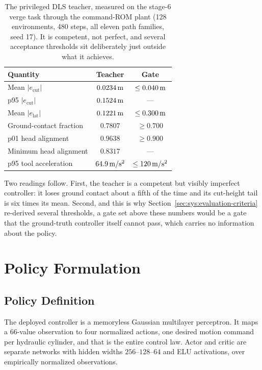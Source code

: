\begin{table}[tb]
  \centering
  \caption{The privileged DLS teacher, measured on the stage-6 verge task
  through the command-ROM plant (128 environments, 480 steps, all eleven path
  families, seed 17). It is competent, not perfect,
and several acceptance thresholds sit deliberately just outside what it achieves.}
  \label{tab:ctrl:teacher}
  \small
  \begin{tabular}{lcc}
    \toprule
    Quantity & Teacher & Gate \\
    \midrule
    Mean $|e_{\mathrm{cut}}|$        & $\unit[0.0234]{m}$ & $\leq \unit[0.040]{m}$ \\
    p95 $|e_{\mathrm{cut}}|$         & $\unit[0.1524]{m}$ & --- \\
    Mean $|e_{\mathrm{lat}}|$        & $\unit[0.1221]{m}$ & $\leq \unit[0.300]{m}$ \\
    Ground-contact fraction          & $0.7807$ & $\geq 0.700$ \\
    p01 head alignment               & $0.9638$ & $\geq 0.900$ \\
    Minimum head alignment           & $0.8317$ & --- \\
    p95 tool acceleration            & $\unit[64.9]{m/s^2}$ & $\leq \unit[120]{m/s^2}$ \\
    \bottomrule
  \end{tabular}
\end{table}

Two readings follow. First, the teacher is a competent but visibly imperfect
controller: it loses ground contact about a fifth of the time and its
cut-height tail is six times its mean. Second, and this is why
Section~\ref{sec:sys:evaluation-criteria} re-derived several thresholds,
a gate set above these numbers would be a gate that the ground-truth controller
itself cannot pass, which carries no information about the policy.

\section{Policy Formulation}
\label{sec:ctrl:ppo}

\subsection{Policy Definition}

The deployed controller is a memoryless Gaussian multilayer perceptron. It maps
a $66$-value observation to four normalized actions, one desired motion command
per hydraulic cylinder, and that is the entire control law. Actor and critic
are separate networks with hidden widths $256$--$128$--$64$ and ELU
activations, over empirically normalized observations.

